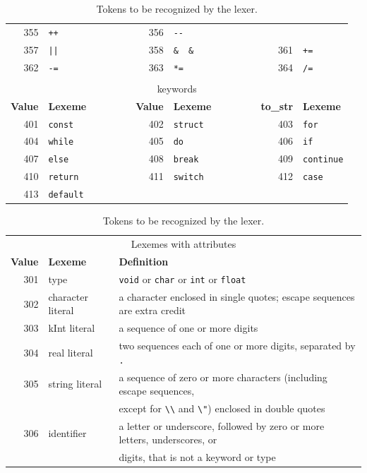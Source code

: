 \documentclass{report}
\newcommand{\+}{}
\begin{document}
\begin{table}[t]
\begin{tabular}{rlcrlcrl}
            355 & \verb|++| & &
            356 & \verb|--| \\
            357 & \verb+||+ & &
            358 & \verb|&  &  | & &
            361 & \verb|+=| \\
            362 & \verb|-=| & &
            363 & \verb|*=| & &
            364 & \verb|/=| \\
            \\
            \multicolumn{8}{c}{keywords}
            \\[1mm]
            {\bf Value} & {\bf Lexeme}
            & ~~~~~~ &
                {\bf Value} & {\bf Lexeme}
            & ~~~~~~ &
                {\bf to_str} & {\bf Lexeme}
            \\ \cline{1-2} \cline{4-5} \cline{7-8}
            401 & \verb|const| & &
            402 & \verb|struct| & &
            403 & \verb|for| \\
            404 & \verb|while| & &
            405 & \verb|do| & &
            406 & \verb|if| \\
            407 & \verb|else| & &
            408 & \verb|break| & &
            409 & \verb|continue| \\
            410 & \verb|return| & &
            411 & \verb|switch| & &
            412 & \verb|case| \\
            413 & \verb|default| \\
        \end{tabular}

        \begin{tabular}{rll}
            \\
            \multicolumn{3}{c}{Lexemes with attributes}
            \\[1mm]
            {\bf Value} & {\bf Lexeme} & {\bf Definition}
            \\ \hline
            301 & type & \verb|void| or \verb|char| or \verb|int| or \verb|float|
            \\
            302 & character literal & a character enclosed in single quotes;
            escape sequences are extra credit
            \\
            303 & kInt literal & a sequence of one or more digits
            \\
            304 & real literal & two sequences each of one or more digits, separated by \verb|.|
            \\
            305 & string literal & a sequence of zero or more characters (including escape sequences,
            \\ & & except for \verb|\\| and \verb|\"|) enclosed in double quotes
            \\
            306 & identifier & a letter or underscore, followed by zero or more letters,
            underscores, or
            \\ & & digits, that is not a keyword or type
        \end{tabular}

        \caption{Tokens to be recognized by the lexer.}
        \label{tab:tokens}
    \end{table}
\end{document}
